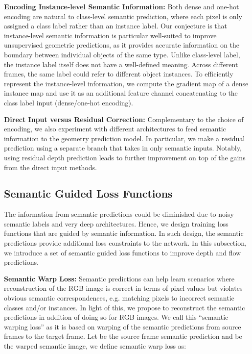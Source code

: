 \documentclass[10pt,twocolumn]{article}
\newcommand{\Noindent}{\vspace{2pt} \noindent}
\newcommand{\partitle}[1]{\Noindent\textbf{#1: }}
\begin{document}
\partitle{Encoding Instance-level Semantic Information}Both dense and one-hot encoding are natural to class-level semantic prediction, where each pixel is only assigned a class label rather than an instance label. Our conjecture is that instance-level semantic information is particular well-suited to improve unsupervised geometric predictions, as it provides accurate information on the boundary between individual objects of the same type. Unlike class-level label, the instance label itself does not have a well-defined meaning. Across different frames, the same label could refer to different object instances. To efficiently represent the instance-level information, we compute the gradient map of a dense instance map and use it as an additional feature channel concatenating to the class label input (dense/one-hot encoding).

\partitle{Direct Input versus Residual Correction}Complementary to the choice of encoding, we also experiment with different architectures to feed semantic information to the geometry prediction model. In particular, we make a residual prediction using a separate branch that takes in only semantic inputs. Notably, using residual depth prediction leads to further improvement on top of the gains from the direct input methods.

\subsection{Semantic Guided Loss Functions}
\label{method:semantic_loss}
The information from semantic predictions could be diminished due to noisy semantic labels and very deep architectures. Hence, we design training loss functions that are guided by semantic information. In such design, the semantic predictions provide additional loss constraints to the network. In this subsection, we introduce a set of semantic guided loss functions to improve depth and flow predictions. 

\partitle{Semantic Warp Loss}Semantic predictions can help learn scenarios where reconstruction of the RGB image is correct in terms of pixel values but violates obvious semantic correspondences, e.g. matching pixels to incorrect semantic classes and/or instances. In light of this, we propose to reconstruct the semantic predictions in addition of doing so for RGB images. We call this ``semantic warping loss'' as it is based on warping of the semantic predictions from source frames to the target frame. Let  be the source frame semantic prediction and  be the warped semantic image, we define semantic warp loss as:
\end{document}

